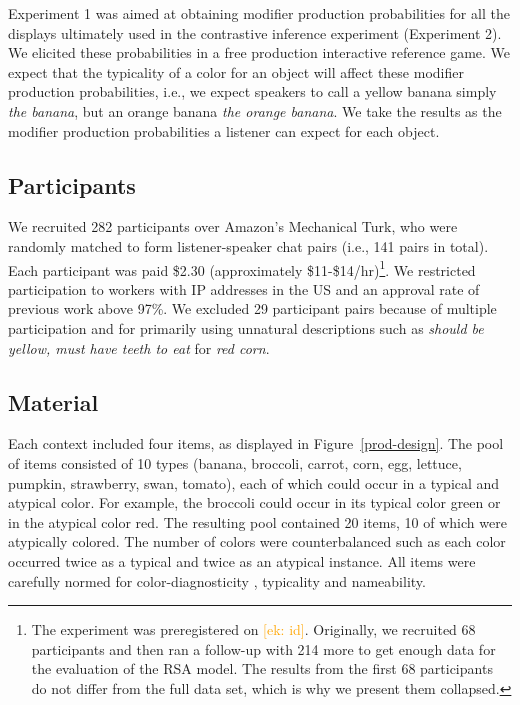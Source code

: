 \documentclass[10pt,letterpaper]{article}
\newcommand{\ek}[1]{\textcolor{Orange}{[ek: #1]}}
\begin{document}
Experiment 1 was aimed at obtaining modifier production probabilities for all the displays ultimately used in the contrastive inference experiment (Experiment 2). We elicited these probabilities in a free production interactive reference game. We expect that the typicality of a color for an object will affect these modifier production probabilities, i.e., we expect speakers to call a yellow banana simply \textit{the banana}, but an orange banana \textit{the orange banana}. We take the results as the modifier production probabilities a listener can expect for each object.

\subsection{Participants}
We recruited 282 participants over Amazon's Mechanical Turk, who were randomly matched to form listener-speaker chat pairs (i.e., 141 pairs in total). 
Each participant was paid \$2.30 (approximately \$11-\$14/hr)\footnote{The experiment was preregistered on \ek{id}. Originally, we recruited 68 participants and then ran a follow-up with 214 more to get enough data for the evaluation of the RSA model. The results from the first 68 participants do not differ from the full data set, which is why we present them collapsed.}. We restricted participation to workers with IP addresses in the US and an approval rate of previous work above 97\%.
We excluded 29 participant pairs because of multiple participation and for primarily using unnatural descriptions such as \textit{should be yellow, must have teeth to eat} for \textit{red corn}.



\subsection{Material} \label{Material}
Each context included four items, as displayed in Figure~\ref{prod-design}. The pool of items consisted of 10 types (banana, broccoli, carrot, corn, egg, lettuce, pumpkin, strawberry, swan, tomato), each of which could occur in a typical and atypical color. For example, the broccoli could occur in its typical color green or in the atypical color red. The resulting pool contained 20 items, 10 of which were atypically colored. The number of colors were counterbalanced such as each color occurred twice as a typical and twice as an atypical instance. All items were carefully normed for color-diagnosticity \cite{Tanaka:1999}, typicality and nameability.
\end{document}
